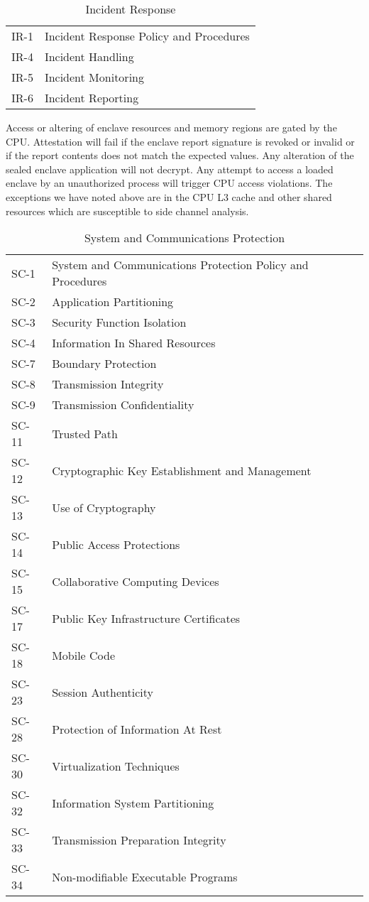 \begin{table}[H]
\centering
\caption{Incident Response}
\label{tab:controls_ir}
\begin{tabular}{@{}ll@{}}
\toprule
IR-1 & Incident Response Policy and Procedures \\ 
IR-4 & Incident Handling \\
IR-5 & Incident Monitoring \\
IR-6 & Incident Reporting \\
\bottomrule
\end{tabular}
\end{table}

Access or altering of enclave resources and memory regions are gated by the CPU. Attestation will fail if the enclave report signature is revoked or invalid or if the report contents does not match the expected values. Any alteration of the sealed enclave application will not decrypt. Any attempt to access a loaded enclave by an unauthorized process will trigger CPU access violations. The exceptions we have noted above are in the CPU L3 cache and other shared resources which are susceptible to side channel analysis. 

\begin{table}[H]
\centering
\caption{System and Communications Protection}
\label{tab:controls_sc}
\begin{tabular}{@{}ll@{}}
\toprule
SC-1 & System and Communications Protection Policy and Procedures \\ 
SC-2 & Application Partitioning \\
SC-3 & Security Function Isolation \\
SC-4 & Information In Shared Resources \\
SC-7 & Boundary Protection \\
SC-8 & Transmission Integrity \\
SC-9 & Transmission Confidentiality \\
SC-11 & Trusted Path \\
SC-12 & Cryptographic Key Establishment and Management \\
SC-13 & Use of Cryptography \\
SC-14 & Public Access Protections \\
SC-15 & Collaborative Computing Devices \\
SC-17 & Public Key Infrastructure Certificates \\
SC-18 & Mobile Code \\
SC-23 & Session Authenticity \\
SC-28 & Protection of Information At Rest \\
SC-30 & Virtualization Techniques \\
SC-32 & Information System Partitioning \\
SC-33 & Transmission Preparation Integrity \\
SC-34 & Non-modifiable Executable Programs \\ 
\bottomrule
\end{tabular}
\end{table}

